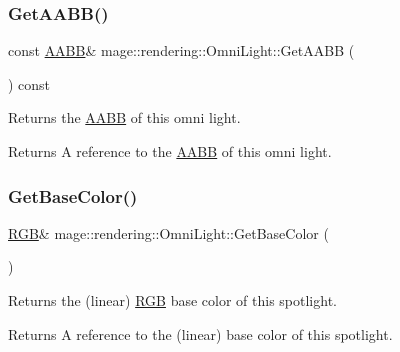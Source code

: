 \subsubsection{\texorpdfstring{Get\+A\+A\+B\+B()}{GetAABB()}}
{\footnotesize\ttfamily const \hyperlink{classmage_1_1_a_a_b_b}{A\+A\+BB}\& mage\+::rendering\+::\+Omni\+Light\+::\+Get\+A\+A\+BB (\begin{DoxyParamCaption}{ }\end{DoxyParamCaption}) const\hspace{0.3cm}{\ttfamily [noexcept]}}

Returns the \hyperlink{classmage_1_1_a_a_b_b}{A\+A\+BB} of this omni light.

\begin{DoxyReturn}{Returns}
A reference to the \hyperlink{classmage_1_1_a_a_b_b}{A\+A\+BB} of this omni light. 
\end{DoxyReturn}
\hypertarget{classmage_1_1rendering_1_1_omni_light_a408bde4df7fd40750cb0e4dd4d2f6d1a}{}\label{classmage_1_1rendering_1_1_omni_light_a408bde4df7fd40750cb0e4dd4d2f6d1a} 
\subsubsection{\texorpdfstring{Get\+Base\+Color()}{GetBaseColor()}\hspace{0.1cm}{\footnotesize\ttfamily [1/2]}}
{\footnotesize\ttfamily \hyperlink{structmage_1_1_r_g_b}{R\+GB}\& mage\+::rendering\+::\+Omni\+Light\+::\+Get\+Base\+Color (\begin{DoxyParamCaption}{ }\end{DoxyParamCaption})\hspace{0.3cm}{\ttfamily [noexcept]}}

Returns the (linear) \hyperlink{structmage_1_1_r_g_b}{R\+GB} base color of this spotlight.

\begin{DoxyReturn}{Returns}
A reference to the (linear) base color of this spotlight. 
\end{DoxyReturn}
\hypertarget{classmage_1_1rendering_1_1_omni_light_a6c68ed32167890c1b0f01130c610c3e2}{}\label{classmage_1_1rendering_1_1_omni_light_a6c68ed32167890c1b0f01130c610c3e2} 

